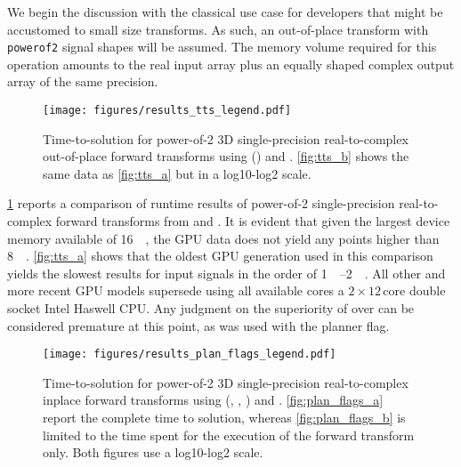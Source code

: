 We begin the discussion with the classical use case for developers that might be accustomed to small size transforms. As such, an out-of-place transform with \texttt{powerof2} signal shapes will be assumed. The memory volume required for this operation amounts to the real input array plus an equally shaped complex output array of the same precision.   

\begin{figure}[!htbp]
  \centering
  \texttt{[image: figures/results\_tts\_legend.pdf]}\vspace{-1em}
  \hfill
  \caption{Time-to-solution for power-of-2 3D single-precision real-to-complex out-of-place forward transforms using \fftw{} () and \cufft{}. \cref{fig:tts_b} shows the same data as \cref{fig:tts_a} but in a log10-log2 scale.}
  \label{fig:tts}
\end{figure}

\cref{fig:tts} reports a comparison of runtime results of power-of-2 single-precision real-to-complex forward transforms from \fftw{} and \cufft{}. It is evident that given the largest device memory available of  \SI{16}{\gibi\byte}, the GPU data does not yield any points higher than \SI{8}{\gibi\byte}. \cref{fig:tts_a} shows that the oldest GPU generation used in this comparison yields the slowest results for input signals in the order of \SIrange{1}{2}{\gibi\byte}. All other and more recent GPU models supersede \fftw{} using all available cores a $2{\times}12\,\text{core}$ double socket Intel Haswell CPU. Any judgment on the superiority of \cufft{} over \fftw{} can be considered premature at this point, as \fftw{} was used with the  planner flag.

\begin{figure}[!htbp]
  \centering
  \texttt{[image: figures/results\_plan\_flags\_legend.pdf]}\vspace{-1em}
  \hfill
  \caption{Time-to-solution for power-of-2 3D single-precision real-to-complex inplace forward transforms using \fftw{} (, , ) and \cufft{}. \cref{fig:plan_flags_a} report the complete time to solution, whereas \cref{fig:plan_flags_b} is limited to the time spent for the execution of the forward transform only. Both figures use a log10-log2 scale.}
  \label{fig:fftw_plan_flags}
\end{figure}

